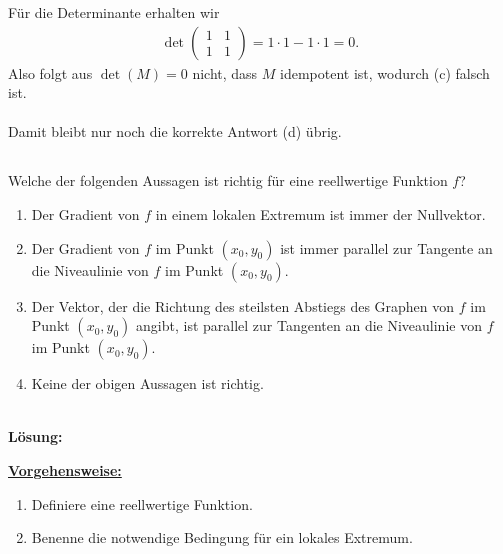 Für die Determinante erhalten wir
\begin{align*}
\det \begin{pmatrix}
1 & 1 \\
1 & 1
\end{pmatrix}
= 1 \cdot 1 - 1 \cdot 1 = 0.
\end{align*}
Also folgt aus $ \det(M) = 0 $ nicht, dass $ M $ idempotent ist, wodurch (c) falsch ist.\\
\\
Damit bleibt nur noch die korrekte Antwort (d) übrig.



\newpage

\subsection*{}
Welche der folgenden Aussagen ist richtig für eine reellwertige Funktion $ f $?
\renewcommand{\labelenumi}{(\alph{enumi})}
\begin{enumerate}
	\item 
	Der Gradient von $ f $ in einem lokalen Extremum ist immer der Nullvektor.
	\item
	Der Gradient von $ f $ im Punkt $ (x_0,y_0) $ ist immer parallel zur Tangente an die Niveaulinie von $ f $ im Punkt $ (x_0,y_0) $.
	
	\item
	Der Vektor, der die Richtung des steilsten Abstiegs des Graphen von $ f $ im Punkt $ (x_0,y_0) $ angibt, ist parallel zur Tangenten an die Niveaulinie von $ f $ im Punkt $ (x_0,y_0) $.
	\item
	Keine der obigen Aussagen ist richtig.
\end{enumerate}
\ \\
\textbf{Lösung:}
\begin{mdframed}
\underline{\textbf{Vorgehensweise:}}
\renewcommand{\labelenumi}{\theenumi.}
\begin{enumerate}
\item Definiere eine reellwertige Funktion.
\item Benenne die notwendige Bedingung für ein lokales Extremum.
\end{enumerate}
\end{mdframed}

